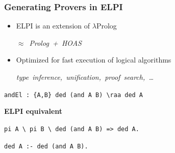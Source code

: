 \documentclass{beamer}
\newcommand{\com}[1]{\strut\hfil\strut\null\nobreak\hfill\hbox{{\itshape \color{black!50}#1}}\par}
\begin{document}
\begin{frame}[fragile]
    \frametitle{Generating Provers in ELPI}
    \begin{itemize}
        \item ELPI is an extension of $\lambda$Prolog \com{$\approx$ Prolog + HOAS}
        \item Optimized for fast execution of logical algorithms \com{type inference, unification, proof search, \dots}
    \end{itemize}

    \vspace{2em}
    
     \lstinline[language=MMT]|andEl : {A,B} ded (and A B) \raa ded A|

    \vspace{1.0em}
    \textbf{ELPI equivalent}

    \vspace{0.5em}
     \lstinline[language=ELPI]|pi A \ pi B \ ded (and A B) => ded A.|

    \vspace{0.5em}
     \lstinline[language=ELPI]|ded A :- ded (and A B).|

\end{frame}
\end{document}
